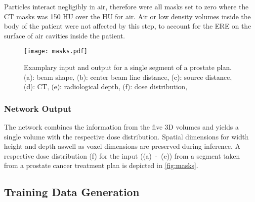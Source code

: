 Particles interact negligibly in air, therefore were all masks set to zero where the CT masks was 150 HU over the HU for air. Air or low density volumes inside the body of the patient were not affected by this step, to account for the \acs{ERE} on the surface of air cavities inside the patient. 

\begin{figure}
    \centering
    \texttt{[image: masks.pdf]}
    \caption{Examplary input and output for a single segment of a prostate plan. (a): beam shape, (b): center beam line distance, (c): source distance, (d): CT, (e): radiological depth, (f): dose distribution, }\label{fig:masks}
\end{figure}

\subsubsection{Network Output}

The network combines the information from the five 3D volumes and yields a single volume with the respective dose distribution. Spatial dimensions for width height and depth aswell as voxel dimensions are preserved during inference. A respective dose distribution (f) for the input ((a)~-~(e)) from a segment taken from a prostate cancer treatment plan is depicted in \autoref{fig:masks}.

\subsection{Training Data Generation}

